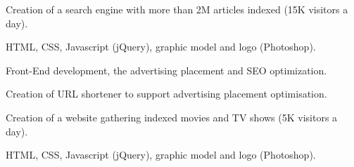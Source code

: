 \documentclass[letterpaper]{my-resume}
\begin{document}
\begin{minipage}[t]{0.66\textwidth}
\sectionspace



Creation of a search engine with more than 2M articles indexed (15K visitors a day).
\begin{tightitemize}
\item HTML, CSS, Javascript (jQuery), graphic model and logo (Photoshop).
\item Front-End development, the advertising placement and SEO optimization.
\item Creation of URL shortener to support advertising placement optimisation.
\end{tightitemize}

\sectionspace



Creation of a website gathering indexed movies and TV shows (5K visitors a day).
\begin{tightitemize}
\item HTML, CSS, Javascript (jQuery), graphic model and logo (Photoshop).
\end{tightitemize}

\sectionspace


\end{minipage} 
\end{document}

